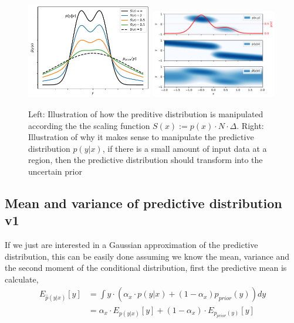\begin{figure}[H]
    \centering
    \includegraphics[trim=0.3cm 0cm 0.1cm 0.2cm,clip,width=0.49\textwidth]{Pictures/mixture_predictive_bayesian.pdf}
    \includegraphics[trim=0.3cm 0cm 0.1cm 0.2cm,clip,width=0.49\textwidth]{Pictures/mixture_predictive_bayesian2D.pdf}
    \caption{Left: Illustration of how the preditive distribution is manipulated according
    the the scaling function $S(x) := p(x)\cdot N\cdot \Delta$. Right: Illustration of why it makes
    sense to manipulate the predictive distribution $p(y|x)$, if there is a small amount of input data
    at a region, then the predictive distribution should transform into the uncertain prior}
    \label{pred_dist_manipulation}
\end{figure}

\subsection{Mean and variance of predictive distribution v1}\label{mean_variance_pred_mixture}
If we just are interested in a Gaussian approximation of the predictive
distribution, this can be easily done assuming we know the mean, variance
and the second moment of the conditional distribution, first the predictive mean
is calculate, 
\begin{align*}
    E_{\hat p(y|x)}[y] &= \int y \cdot \left(\alpha_x \cdot p(y|x) + (1-\alpha_x) p_{prior}(y)\right) dy\\
    &= \alpha_x\cdot E_{p(y|x)}[y] + (1-\alpha_x)\cdot E_{p_{prior}(y)}[y]
\end{align*}

